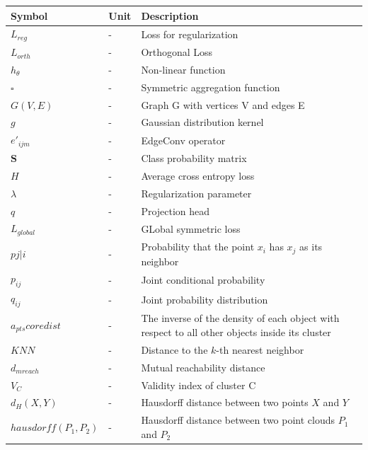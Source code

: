 \begin{table}[H]
  \setlength\extrarowheight{5pt}
  \centering
  \begin{tabular}{|p{70pt}|p{30pt}|p{350pt}|}
    \toprule
    Symbol	& Unit	& Description\\
    \midrule    
    $\mathit{L_{reg}}$ & - & Loss for regularization \\
    $\mathit{L_{orth}}$ & - & Orthogonal Loss \\
    $h_{\theta}$ & - & Non-linear function \\
    $\square$ & - & Symmetric aggregation function \\
    $\mathit{G(V,E)}$ & - & Graph G with vertices V and edges E \\
    $\mathit{g}$ & - & Gaussian distribution kernel \\
    $\mathit{e'_{ijm}}$ & - & EdgeConv operator \\
    $\mathbf{S}$ & - & Class probability matrix \\
    $H$ &- & Average cross entropy loss \\
    $\lambda$ & - & Regularization parameter \\
    $\mathit{q}$ & - & Projection head \\
    $\mathit{L_{global}}$ & - & GLobal symmetric loss \\
    $pj|i$ & - & Probability that the point $x_i$ has $x_j$ as its neighbor \\
    $\mathit{p_{ij}}$ & - & Joint conditional probability \\
    $\mathit{q_{ij}}$ & - & Joint probability distribution \\
    $\mathit{a_{pts}coredist}$ & - & The inverse of the density of each object with respect to all other objects inside its cluster  \\    
    $KNN$ & - & Distance to the $k$-th nearest neighbor \\
    $\mathit{d_{mreach}}$ & - & Mutual reachability distance \\
    $\mathit{V_C}$ & - & Validity index of cluster C \\
    $\mathit{d_H(X,Y)}$ & - & Hausdorff distance between two points $X$ and $Y$ \\
    $\mathit{hausdorff(P_1, P_2)}$ & - & Hausdorff distance between two point clouds $P_1$ and $P_2$ \\
    \bottomrule
  \end{tabular}
\end{table}
